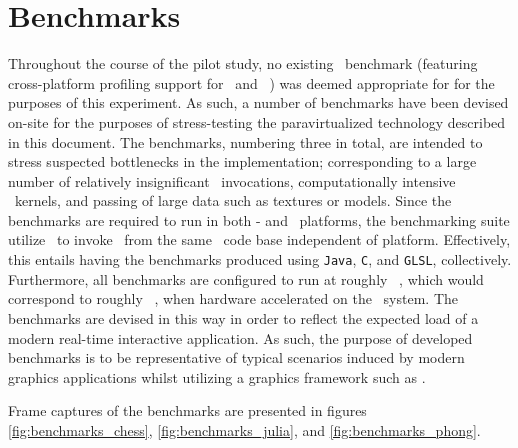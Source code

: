 \section{Benchmarks}
\label{sec:experimentalmethodology_benchmarks}
Throughout the course of the pilot study, no existing \dvttermopenglestwopointo\ benchmark (featuring cross-platform profiling support for \dvttermandroid\ and \dvttermxeleven\ \dvttermlinux ) was deemed appropriate for for the purposes of this experiment.
As such, a number of benchmarks have been devised on-site for the purposes of stress-testing the paravirtualized technology described in this document.
The benchmarks, numbering three in total, are intended to stress suspected bottlenecks in the implementation; corresponding to a large number of relatively insignificant \dvttermopengles\ invocations, computationally intensive \dvttermgpu\ kernels, and passing of large data such as textures or models.
Since the benchmarks are required to run in both \dvttermlinux - and \dvttermandroid\ platforms, the benchmarking suite utilize \dvttermjni\ to invoke \dvttermopengles\ from the same \dvttermc\ code base independent of platform.
Effectively, this entails having the benchmarks produced using \texttt{Java}, \texttt{C}, and \texttt{GLSL}, collectively.
Furthermore, all benchmarks are configured to run at roughly ~\milli\second , which would correspond to roughly ~\dvttermfps , when hardware accelerated on the \dvttermhost\ system.
The benchmarks are devised in this way in order to reflect the expected load of a modern real-time interactive application.
As such, the purpose of developed benchmarks is to be representative of typical scenarios induced by modern graphics applications whilst utilizing a graphics framework such as \dvttermopengl .

Frame captures of the benchmarks are presented in figures \ref{fig:benchmarks_chess}, \ref{fig:benchmarks_julia}, and \ref{fig:benchmarks_phong}.



